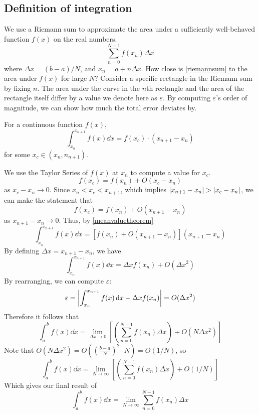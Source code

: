 \subsection{Definition of integration}
We use a Riemann sum to approximate the area under a sufficiently well-behaved function \(f(x)\) on the real numbers.
\begin{equation}\label{riemannsum}
	\sum_{n=0}^{N-1} f(x_n) \Delta x
\end{equation}
where \(\Delta x = (b-a)/N\), and \(x_n = a + n\Delta x\).
How close is \eqref{riemannsum} to the area under \(f(x)\) for large \(N\)?
Consider a specific rectangle in the Riemann sum by fixing \(n\).
The area under the curve in the \(n\)th rectangle and the area of the rectangle itself differ by a value we denote here as \(\varepsilon\).
By computing \(\varepsilon\)'s order of magnitude, we can show how much the total error deviates by.

\begin{theorem}
	For a continuous function \(f(x)\),
	\begin{equation}\label{meanvaluetheorem}
		\int_{x_n}^{x_{n+1}} f(x) \dd{x} = f(x_c) \cdot (x_{n+1} - x_n)
	\end{equation}
	for some \(x_c\in (x_n, n_{n+1})\).
\end{theorem}
We use the Taylor Series of \(f(x)\) at \(x_n\) to compute a value for \(x_c\).
\[
	f(x_c) = f(x_n) + O(x_c - x_n)
\]
as \(x_c - x_n \to 0\).
Since \(x_n < x_c < x_{n+1}\), which implies \(\abs{x_{n+1} - x_n} > \abs{x_c - x_n}\), we can make the statement that
\[
	f(x_c) = f(x_n) + O(x_{n+1} - x_n)
\]
as \(x_{n+1} - x_n \to 0\).
Thus, by \eqref{meanvaluetheorem}
\[
	\int_{x_n}^{x_{n+1}} f(x) \dd{x} = \left[ f(x_n) + O(x_{n+1} - x_n) \right] (x_{n+1} - x_n)
\]
By defining \(\Delta x = x_{n+1} - x_n\), we have
\begin{equation}
	\int_{x_n}^{x_{n+1}} f(x) \dd{x} = \Delta x f(x_n) + O(\Delta x ^ 2)
\end{equation}
By rearranging, we can compute \(\varepsilon\):
\[
	\varepsilon = \abs{\int_{x_n}^{x_{n+1}} f(x) \dd{x} - \Delta x f(x_n)} = O(\Delta x ^ 2)
\]
Therefore it follows that
\[
	\int_{a}^{b} f(x) \dd{x} = \lim_{\Delta x \to 0} \left[ \left( \sum_{n=0}^{N-1} f(x_n) \Delta x \right) + O(N\Delta x^2) \right]
\]
Note that \(O(N\Delta x^2) = O((\frac{b-a}{N})^2 \cdot N) = O(1/N)\), so
\[
	\int_{a}^{b} f(x) \dd{x} = \lim_{N \to \infty} \left[ \left( \sum_{n=0}^{N-1} f(x_n) \Delta x \right) + O(1/N) \right]
\]
Which gives our final result of
\begin{equation}\label{definiteintegral}
	\int_{a}^{b} f(x) \dd{x} = \lim_{N \to \infty} \sum_{n=0}^{N-1} f(x_n) \Delta x
\end{equation}

